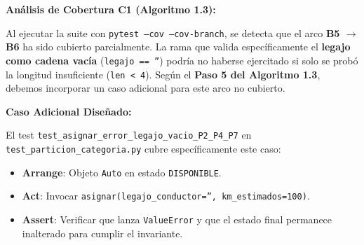 \begin{center}
\end{center}

\textbf{Análisis de Cobertura C1 (Algoritmo 1.3):}

Al ejecutar la suite con \texttt{pytest --cov --cov-branch}, se detecta que el arco \textbf{B5 $\rightarrow$ B6} ha sido cubierto parcialmente. La rama que valida específicamente el \textbf{legajo como cadena vacía} (\texttt{legajo == ''}) podría no haberse ejercitado si solo se probó la longitud insuficiente (\texttt{len < 4}). Según el \textbf{Paso 5 del Algoritmo 1.3}, debemos incorporar un caso adicional para este arco no cubierto.

\textbf{Caso Adicional Diseñado:}

El test \texttt{test\_asignar\_error\_legajo\_vacio\_P2\_P4\_P7} en \texttt{test\_particion\_categoria.py} cubre específicamente este caso:
\begin{itemize}
    \item \textbf{Arrange}: Objeto \texttt{Auto} en estado \texttt{DISPONIBLE}.
    \item \textbf{Act}: Invocar \texttt{asignar(legajo\_conductor='', km\_estimados=100)}.
    \item \textbf{Assert}: Verificar que lanza \texttt{ValueError} y que el estado final permanece inalterado para cumplir el invariante.
\end{itemize}

